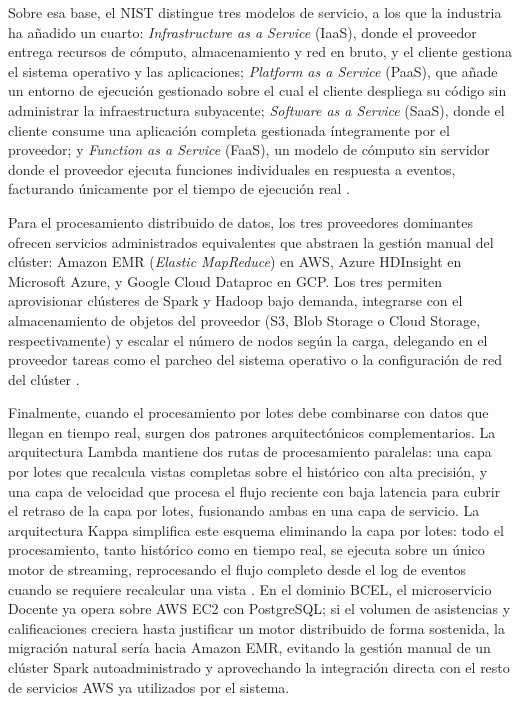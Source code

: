 \documentclass[11pt,a4paper]{article}
\begin{document}
Sobre esa base, el NIST distingue tres modelos de servicio, a los que la
industria ha añadido un cuarto: \textit{Infrastructure as a Service} (IaaS),
donde el proveedor entrega recursos de cómputo, almacenamiento y red en bruto,
y el cliente gestiona el sistema operativo y las aplicaciones; \textit{Platform
as a Service} (PaaS), que añade un entorno de ejecución gestionado sobre el
cual el cliente despliega su código sin administrar la infraestructura
subyacente; \textit{Software as a Service} (SaaS), donde el cliente consume
una aplicación completa gestionada íntegramente por el proveedor; y
\textit{Function as a Service} (FaaS), un modelo de cómputo sin servidor donde
el proveedor ejecuta funciones individuales en respuesta a eventos, facturando
únicamente por el tiempo de ejecución real \cite{burns2024}.

Para el procesamiento distribuido de datos, los tres proveedores dominantes
ofrecen servicios administrados equivalentes que abstraen la gestión manual
del clúster: Amazon EMR (\textit{Elastic MapReduce}) en AWS, Azure HDInsight
en Microsoft Azure, y Google Cloud Dataproc en GCP. Los tres permiten
aprovisionar clústeres de Spark y Hadoop bajo demanda, integrarse con el
almacenamiento de objetos del proveedor (S3, Blob Storage o Cloud Storage,
respectivamente) y escalar el número de nodos según la carga, delegando en el
proveedor tareas como el parcheo del sistema operativo o la configuración de
red del clúster \cite{burns2024}.

Finalmente, cuando el procesamiento por lotes debe combinarse con datos que
llegan en tiempo real, surgen dos patrones arquitectónicos complementarios.
La arquitectura Lambda mantiene dos rutas de procesamiento paralelas: una capa
por lotes que recalcula vistas completas sobre el histórico con alta
precisión, y una capa de velocidad que procesa el flujo reciente con baja
latencia para cubrir el retraso de la capa por lotes, fusionando ambas en una
capa de servicio. La arquitectura Kappa simplifica este esquema eliminando la
capa por lotes: todo el procesamiento, tanto histórico como en tiempo real, se
ejecuta sobre un único motor de streaming, reprocesando el flujo completo
desde el log de eventos cuando se requiere recalcular una vista
\cite{burns2024}. En el dominio BCEL, el microservicio Docente ya opera sobre
AWS EC2 con PostgreSQL; si el volumen de asistencias y calificaciones
creciera hasta justificar un motor distribuido de forma sostenida, la
migración natural sería hacia Amazon EMR, evitando la gestión manual de un
clúster Spark autoadministrado y aprovechando la integración directa con el
resto de servicios AWS ya utilizados por el sistema.
\end{document}
